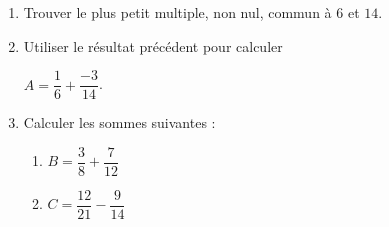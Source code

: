 \begin{exercice*}
    \begin{spacing}{1.5}
        \begin{enumerate}
            \item Trouver le plus petit multiple, non nul, commun à $6$ et $14$.        
            \item Utiliser le résultat précédent pour calculer 
            
            $A=\dfrac{1}{6}+\dfrac{-3}{14}$.
            \item Calculer les sommes suivantes :
            \begin{enumerate}
                \item $B=\dfrac{3}{8}+\dfrac{7}{12}$
                \item $C=\dfrac{12}{21}-\dfrac{9}{14}$
            \end{enumerate}        
        \end{enumerate}
    \end{spacing}
\end{exercice*}
